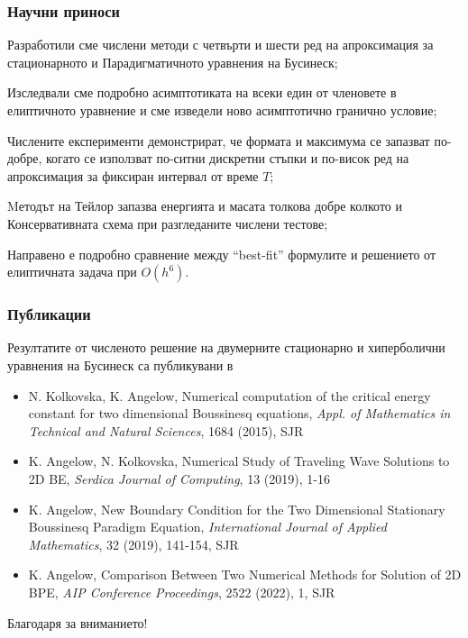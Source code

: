\documentclass{beamer}
\begin{document}
\begin{frame}
\frametitle{Научни приноси}

\begin{itemize}
{\small
  \item Разработили сме числени методи с четвърти и шести ред на апроксимация за стационарното и Парадигматичното уравнения на Бусинеск;
  \item Изследвали сме подробно асимптотиката на всеки един от членовете в елиптичното уравнение и сме изведели ново асимптотично гранично условие; 
  \item Числените експерименти демонстрират, че формата и максимума се запазват по-добре, когато се използват по-ситни дискретни стъпки и по-висок ред на апроксимация за фиксиран интервал от време $T$;
  \item Mетодът на Тейлор запазва енергията и масата толкова добре колкото и Консервативната схема при разгледаните числени тестове;
 \item Направено е подробно сравнение между ``best-fit'' формулите и решението от елиптичната задача при $O(h^6)$.
}
\end{itemize}

\end{frame}


\begin{frame}
\frametitle{Публикации}

Резултатите от численото решение на двумерните стационарно и хиперболични уравнения на Бусинеск са
публикувани в
\begin{itemize}
  \item N. Kolkovska, K. Angelow, Numerical computation of the critical energy constant for two dimensional Boussinesq equations, {\it Appl. of Mathematics in Technical and Natural Sciences}, 1684 (2015), SJR
  \item K. Angelow, N. Kolkovska, Numerical Study of Traveling Wave Solutions to 2D BE, {\it Serdica Journal of Computing}, 13 (2019), 1-16
  \item K. Angelow, New Boundary Condition for the Two Dimensional Stationary Boussinesq Paradigm Equation, {\it International Journal of Applied Mathematics}, 32 (2019), 141-154, SJR
   \item K. Angelow, Comparison Between Two Numerical Methods for Solution of 2D BPE, {\it AIP Conference Proceedings}, 2522 (2022), 1, SJR
\end{itemize}

\end{frame}


\begin{frame}

{\Large \center Благодаря за вниманието!}


\end{frame}
\end{document}
